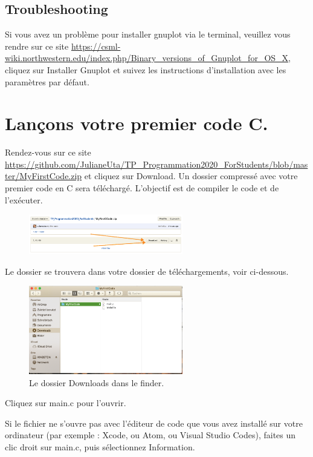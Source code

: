 \documentclass{article}
\begin{document}
\subsection{Troubleshooting}
Si vous avez un problème pour installer gnuplot via le terminal, veuillez vous rendre sur ce site \href{https://csml-wiki.northwestern.edu/index.php/Binary_versions_of_Gnuplot_for_OS_X}{https://csml-wiki.northwestern.edu/index.php/Binary\_versions\_of\_Gnuplot\_for\_OS\_X}, cliquez sur Installer Gnuplot et suivez les instructions d'installation avec les paramètres par défaut.


\section{Lançons votre premier code C.}
Rendez-vous sur ce site \href{https://github.com/JulianeUta/TP_Programmation2020_ForStudents/blob/master/MyFirstCode.zip}{https://github.com/JulianeUta/TP\_Programmation2020\_ForStudents/blob/master/MyFirstCode.zip} et cliquez sur Download. Un dossier compressé avec votre premier code en C sera téléchargé. L'objectif est de compiler le code et de l'exécuter.
\begin{figure}[H]
\center
\includegraphics[width=0.6\textwidth]{Plots/FirstCode_1.png}
\end{figure}
Le dossier se trouvera dans votre dossier de téléchargements, voir ci-dessous.
\begin{figure}[H]
\center
\includegraphics[width=0.6\textwidth]{Plots/DownloadMyFirstCode.png}
\caption{Le dossier Downloads dans le finder.\label{F:locationMyFirstCode}}
\end{figure}
Cliquez sur main.c pour l'ouvrir. 

Si le fichier ne s'ouvre pas avec l'éditeur de code que vous avez installé sur votre ordinateur (par exemple : Xcode, ou Atom, ou Visual Studio Codes), faites un clic droit sur main.c, puis sélectionnez Information. 
\end{document}
